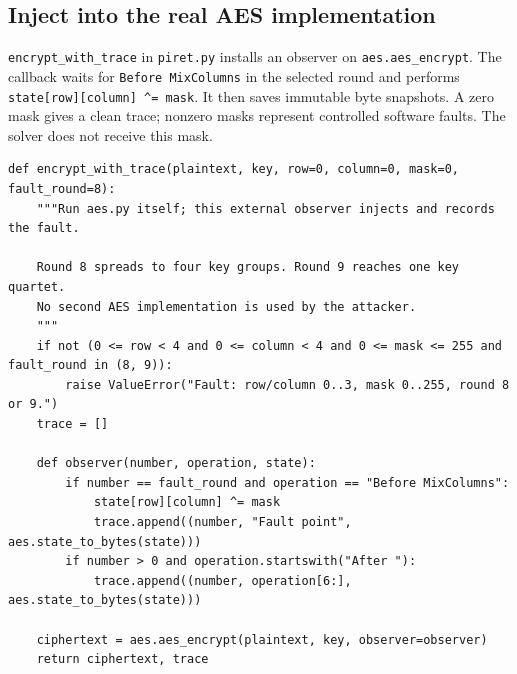 \documentclass[11pt,a4paper]{report}
\begin{document}
\subsection{Inject into the real AES implementation}
\texttt{encrypt\_with\_trace} in \texttt{piret.py} installs an observer on \texttt{aes.aes\_encrypt}. The callback waits for \texttt{Before MixColumns} in the selected round and performs \texttt{state[row][column] ^= mask}. It then saves immutable byte snapshots. A zero mask gives a clean trace; nonzero masks represent controlled software faults. The solver does not receive this mask.
\begin{lstlisting}[style=pycode,caption={External Piret fault injection into the real AES engine}]
def encrypt_with_trace(plaintext, key, row=0, column=0, mask=0, fault_round=8):
    """Run aes.py itself; this external observer injects and records the fault.

    Round 8 spreads to four key groups. Round 9 reaches one key quartet.
    No second AES implementation is used by the attacker.
    """
    if not (0 <= row < 4 and 0 <= column < 4 and 0 <= mask <= 255 and fault_round in (8, 9)):
        raise ValueError("Fault: row/column 0..3, mask 0..255, round 8 or 9.")
    trace = []

    def observer(number, operation, state):
        if number == fault_round and operation == "Before MixColumns":
            state[row][column] ^= mask
            trace.append((number, "Fault point", aes.state_to_bytes(state)))
        if number > 0 and operation.startswith("After "):
            trace.append((number, operation[6:], aes.state_to_bytes(state)))

    ciphertext = aes.aes_encrypt(plaintext, key, observer=observer)
    return ciphertext, trace
\end{lstlisting}
\end{document}
